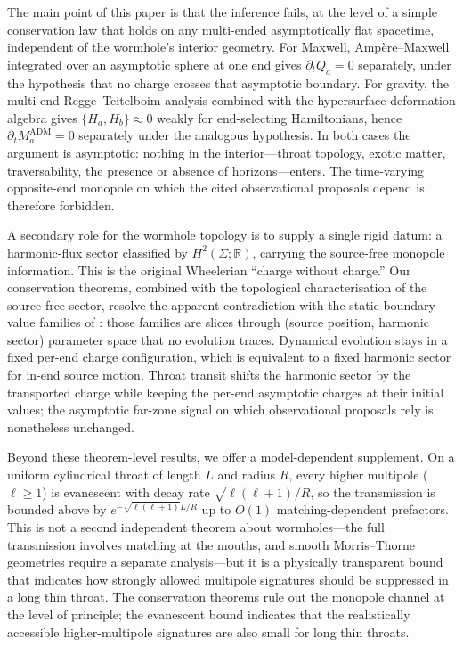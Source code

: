 \documentclass[aps,prd,onecolumn,nofootinbib,superscriptaddress]{revtex4-2}
\begin{document}
The main point of this paper is that the inference fails, at the level of a simple conservation law that holds on any multi-ended asymptotically flat spacetime, independent of the wormhole's interior geometry. For Maxwell, Amp\`ere--Maxwell integrated over an asymptotic sphere at one end gives $\partial_t Q_a = 0$ separately, under the hypothesis that no charge crosses that asymptotic boundary. For gravity, the multi-end Regge--Teitelboim analysis combined with the hypersurface deformation algebra gives $\{H_a, H_b\} \approx 0$ weakly for end-selecting Hamiltonians, hence $\partial_t M_a^{\mathrm{ADM}} = 0$ separately under the analogous hypothesis. In both cases the argument is asymptotic: nothing in the interior---throat topology, exotic matter, traversability, the presence or absence of horizons---enters. The time-varying opposite-end monopole on which the cited observational proposals depend is therefore forbidden.

A secondary role for the wormhole topology is to supply a single rigid datum: a harmonic-flux sector classified by $H^2(\Sigma;\mathbb{R})$, carrying the source-free monopole information.\cite{MisnerWheeler1957ClassicalPhysics,Wheeler1962Geometrodynamics} This is the original Wheelerian ``charge without charge.'' Our conservation theorems, combined with the topological characterisation of the source-free sector, resolve the apparent contradiction with the static boundary-value families of \cite{DaiStojkovic2019Observing}: those families are slices through (source position, harmonic sector) parameter space that no evolution traces. Dynamical evolution stays in a fixed per-end charge configuration, which is equivalent to a fixed harmonic sector for in-end source motion. Throat transit shifts the harmonic sector by the transported charge while keeping the per-end asymptotic charges at their initial values; the asymptotic far-zone signal on which observational proposals rely is nonetheless unchanged.

Beyond these theorem-level results, we offer a model-dependent supplement. On a uniform cylindrical throat of length $L$ and radius $R$, every higher multipole ($\ell \ge 1$) is evanescent with decay rate $\sqrt{\ell(\ell+1)}/R$, so the transmission is bounded above by $e^{-\sqrt{\ell(\ell+1)}L/R}$ up to $O(1)$ matching-dependent prefactors. This is not a second independent theorem about wormholes---the full transmission involves matching at the mouths, and smooth Morris--Thorne geometries require a separate analysis---but it is a physically transparent bound that indicates how strongly allowed multipole signatures should be suppressed in a long thin throat. The conservation theorems rule out the monopole channel at the level of principle; the evanescent bound indicates that the realistically accessible higher-multipole signatures are also small for long thin throats.
\end{document}
